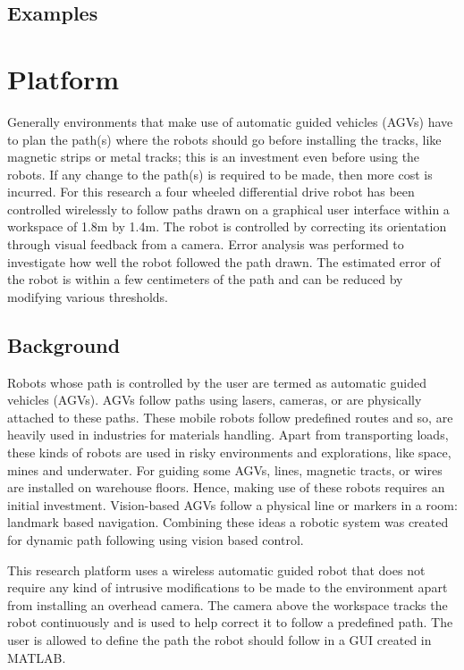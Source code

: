 \documentclass[12pt,american]{report}
\begin{document}
\section{Examples}

\chapter{Platform}
Generally environments that make use of automatic guided vehicles (AGVs) have to plan the path(s) where the robots should go before installing the tracks, like magnetic strips or metal tracks; this is an investment even before using the robots. If any change to the path(s) is required to be made, then more cost is incurred. For this research a four wheeled differential drive robot has been controlled wirelessly to follow paths drawn on a graphical user interface within a workspace of 1.8m by 1.4m. The robot is controlled by correcting its orientation through visual feedback from a camera. Error analysis was performed to investigate how well the robot followed the path drawn. The estimated error of the robot is within a few centimeters of the path and can be reduced by modifying various thresholds.

\section{Background}
Robots whose path is controlled by the user are termed as automatic guided vehicles (AGVs). AGVs follow paths using lasers, cameras, or are physically attached to these paths. These mobile robots follow predefined routes and so, are heavily used in industries for materials handling. Apart from transporting loads, these kinds of robots are used in risky environments and explorations, like space, mines and underwater. For guiding some AGVs, lines, magnetic tracts, or wires are installed on warehouse floors. Hence, making use of these robots requires an initial investment. Vision-based AGVs follow a physical line or markers in a room: landmark based navigation.  Combining these ideas a robotic system was created for dynamic path following using vision based control.  

This research platform uses a wireless automatic guided robot that does not require any kind of intrusive modifications to be made to the environment apart from installing an overhead camera. The camera above the workspace tracks the robot continuously and is used to help correct it to follow a predefined path. The user is allowed to define the path the robot should follow in a GUI created in MATLAB.
\end{document}
